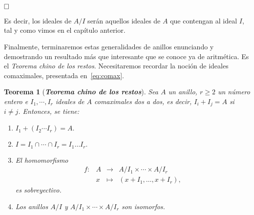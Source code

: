 \documentclass[12pt]{article}
\newtheorem{theorem}{Teorema}[section]
\begin{document}
$\hfill \square$

Es decir, los ideales de $A/I$ serán aquellos ideales de $A$ que contengan al ideal $I$, tal y como vimos en el capítulo anterior.

Finalmente, terminaremos estas generalidades de anillos enunciando y demostrando un resultado más que interesante que se conoce ya de aritmética. Es el \textit{Teorema chino de los restos}. Necesitaremos recordar la noción de ideales comaximales, presentada en~\ref{eq:comax}.

\begin{theorem}[\textbf{\textit{Teorema chino de los restos}}]
Sea $A$ un anillo, $r \geq 2$ un número entero e $I_{1}, \cdots, I_{r}$ ideales de $A$ comaximales dos a dos, es decir, $I_{i} + I_{j} = A$ si $i \neq j$. Entonces, se tiene: \begin{enumerate}
\item $I_{1} + (I_{2} \cdots I_{r}) = A.$
\item $I = I_{1} \cap \cdots \cap I_{r} = I_{1} \ldots I_{r}.$
\item El homomorfismo $$\begin{array}{rccl}
f \colon &A&\longrightarrow &A/I_{1}\times \cdots \times A/I_{r} \\
&x& \longmapsto &(x + I_{1}, \ldots, x+ I_{r}),
\end{array}
$$ es sobreyectivo.
\item Los anillos $A/I$ y $A/I_{1}\times \cdots \times A/I_{r}$ son isomorfos.
\end{enumerate} 
\end{theorem}
\end{document}
